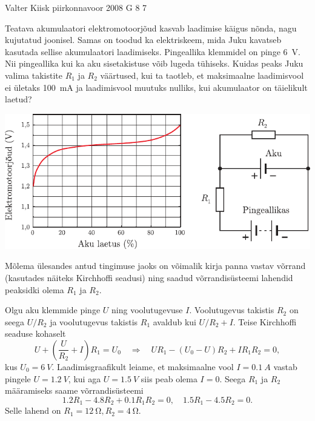 {Valter Kiisk} %
{piirkonnavoor} %
{2008} %
{G 8} %
{7} %
{
\ifStatement
Teatava akumulaatori elektromotoorjõud kasvab laadimise käigus nõnda, nagu kujutatud joonisel. Samas on toodud ka elektriskeem, mida Juku kavatseb kasutada sellise akumulaatori laadimiseks. Pingeallika klemmidel on pinge \SI{6}{V}. Nii pingeallika kui ka aku sisetakistuse võib lugeda tühiseks. Kuidas peaks Juku valima takistite $R_1$ ja $R_2$ väärtused, kui ta taotleb, et maksimaalne laadimisvool ei ületaks \SI{100}{mA} ja laadimisvool muutuks nulliks, kui akumulaator on täielikult laetud? 

\begin{center}
	\includegraphics[width=\linewidth]{2008-v2g-08-yl}
\end{center}
\fi


\ifHint
Mõlema ülesandes antud tingimuse jaoks on võimalik kirja panna vastav võrrand (kasutades näiteks Kirchhoffi seadusi) ning saadud võrrandisüsteemi lahendid peaksidki olema $R_1$ ja $R_2$.
\fi


\ifSolution
Olgu aku klemmide pinge $U$ ning voolutugevuse $I$. Voolutugevus takistis $R_2$ on seega $U/R_2$ ja voolutugevus takistis $R_1$ avaldub kui $U/R_2 + I$. Teise Kirchhoffi seaduse kohaselt 
\[
U+\left(\frac{U}{R_{2}}+I\right) R_{1}=U_{0} \quad \Rightarrow \quad U R_{1}-\left(U_{0}-U\right) R_{2}+I R_{1} R_{2}=0,
\]
kus $U_0 = \SI{6}{V}$. Laadimisgraafikult leiame, et maksimaalne vool $I = \SI{0,1}{A}$ vastab pingele $U = \SI{1,2}{V}$, kui aga $U = \SI{1,5}{V}$ siis peab olema $I = 0$. Seega $R_1$ ja $R_2$ määramiseks saame võrrandisüsteemi 
\[
\num{1,2}R_1 - \num{4,8}R_2 + \num{0,1}R_1R_2 = 0, \quad \num{1,5}R_1 - \num{4,5}R_2 = 0. 
\]
Selle lahend on $R_1 = \SI{12}{\ohm}, R_2 = \SI{4}{\ohm}$.
\fi
}